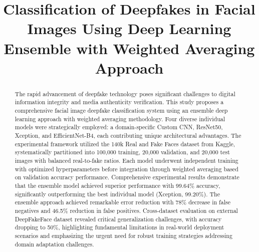 \documentclass[conference]{IEEEtran}
\begin{document}
\title{Classification of Deepfakes in Facial Images Using Deep Learning Ensemble with Weighted Averaging Approach}

\author{
\and
{}
}

\maketitle

\begin{abstract}
The rapid advancement of deepfake technology poses significant challenges to digital information integrity and media authenticity verification. This study proposes a comprehensive facial image deepfake classification system using an ensemble deep learning approach with weighted averaging methodology. Four diverse individual models were strategically employed: a domain-specific Custom CNN, ResNet50, Xception, and EfficientNet-B4, each contributing unique architectural advantages. The experimental framework utilized the 140k Real and Fake Faces dataset from Kaggle, systematically partitioned into 100,000 training, 20,000 validation, and 20,000 test images with balanced real-to-fake ratios. Each model underwent independent training with optimized hyperparameters before integration through weighted averaging based on validation accuracy performance. Comprehensive experimental results demonstrate that the ensemble model achieved superior performance with 99.64\% accuracy, significantly outperforming the best individual model (Xception, 99.20\%). The ensemble approach achieved remarkable error reduction with 78\% decrease in false negatives and 46.5\% reduction in false positives. Cross-dataset evaluation on external DeepFakeFace dataset revealed critical generalization challenges, with accuracy dropping to 50\%, highlighting fundamental limitations in real-world deployment scenarios and emphasizing the urgent need for robust training strategies addressing domain adaptation challenges.
\end{abstract}
\end{document}
